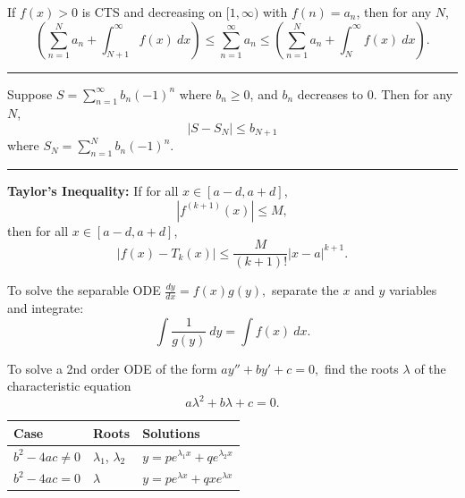 \documentclass{article}
\newenvironment{bx}[1][]{
\begin{tcolorbox}[colback=white!97!black, title=#1, arc=0in, halign=flush left, left=1mm, right=1mm,]
}{
\end{tcolorbox}
}
\begin{document}
\begin{multicols}{2}
\begin{bx}[Test for Convergence and Divergence]
\begin{itemize}[leftmargin=1em]
\end{itemize}
\end{bx}





\newpage



\begin{bx}[Bounding Error]

If $f(x)>0$ is CTS and decreasing on $[1,\infty)$ with $f(n)=a_n$, then for any $N$,
$$\left(\sum_{n=1}^N a_n+\int_{N+1}^\infty f(x)\ dx \right)
\leq \sum_{n=1}^\infty a_n \leq 
\left(\sum_{n=1}^N a_n+  \int_{N}^\infty f(x)\ dx\right).$$

\hrule
\vspace{1em}

Suppose $S=\sum_{n=1}^\infty b_n (-1)^n$ where $b_n\geq 0$, and $b_n$ decreases to 0. Then for any $N$,
$$\left|S-S_N\right|\leq b_{N+1}$$
where $S_N=\sum_{n=1}^N b_n (-1)^n$.
\vspace{1em}

\hrule
\vspace{1em}

\textbf{Taylor's Inequality:}
If for all $x\in [a-d,a+d]$,
$$\left|f^{(k+1)}(x)\right|\leq M,$$
then for all $x\in [a-d,a+d]$,
$$|f(x)-T_k(x)|\leq \frac{M}{(k+1)!}|x-a|^{k+1}.$$


\end{bx}



\columnbreak


\begin{bx}[Solving ODEs]

To solve the separable ODE  $\displaystyle \frac{dy}{dx}=f(x)g(y),$
separate the $x$ and $y$ variables and integrate:
$$\int \frac{1}{g(y)}\ dy = \int f(x)\ dx.$$

To solve a 2nd order ODE of the form $ay''+by'+c=0,$
find the roots $\lambda$ of the characteristic equation
$$a\lambda^2 + b\lambda + c = 0.$$
\begin{center}
\begin{tabular}{lll}
\toprule[0.4mm]
Case & Roots & Solutions\\
\midrule
$b^2-4ac\neq 0$ & $\lambda_1$, $\lambda_2$ & $y=pe^{\lambda_1 x} + qe^{\lambda_2 x}$\\
$b^2-4ac= 0$ & $\lambda$ & $y=pe^{\lambda x}+qxe^{\lambda x}$\\
\bottomrule[0.4mm]
\end{tabular}
\end{center}


\end{bx}
\end{multicols}
\end{document}
